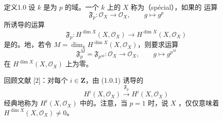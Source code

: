 \begin{SGAresult}{定义}{1.0}
设 $k$ 是为 $p$ 的域。一个 $k$ 上的 $X$ 称为（spécial），如果的 运算
\[
 \mathfrak F_p:\mathcal O_X\longrightarrow\mathcal O_X,
 \qquad g\longmapsto g^p
 \tag{1.0.1}
\]
所诱导的运算
\[
 \mathfrak F_p:H^{\dim X}(X,\mathcal O_X)
 \longrightarrow H^{\dim X}(X,\mathcal O_X)
 \tag{1.0.2}
\]
是的。地，若令 $M=\dim_k H^{\dim X}(X,\mathcal O_X)$，则要求运算
\[
 \mathfrak F_p^M=\mathfrak F_{p^M}:\mathcal O_X\longrightarrow\mathcal O_X,
 \qquad g\longmapsto g^{p^M}
 \tag{1.0.3}
\]
在 $H^{\dim X}(X,\mathcal O_X)$ 上为零。
\end{SGAresult}
回顾文献 [2]：对每个 $i\in\mathbf Z$，由 (1.0.1) 诱导的
\[
 H^i(X,\mathcal O_X)\xrightarrow{\mathfrak F_p}H^i(X,\mathcal O_X)
\]
经典地称为 $H^i(X,\mathcal O_X)$ 中的。注意，当 $p=1$ 时，说 $X$ ，仅仅意味着 $H^{\dim X}(X,\mathcal O_X)\ne0$。

